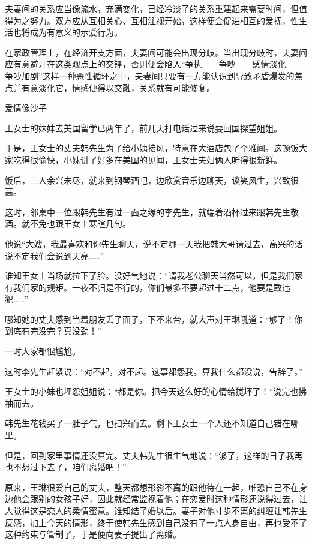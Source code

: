 \documentclass[12pt,UTF8]{ctexbook}
\begin{document}
夫妻间的关系应当像流水，充满变化，已经冷淡了的关系重建起来需要时间，但值得为之努力。双方应从互相关心、互相注视开始，这样便会促进相互的爱抚，性生活也将成为有意义的示爱行为。

在家政管理上，在经济开支方面，夫妻间可能会出现分歧。当出现分歧时，夫妻间应有意避开在这类观点上的交锋，否则便会陷入“争执——争吵——感情淡化——争吵加剧”这样一种恶性循环之中，夫妻间只要有一方能认识到导致矛盾爆发的焦点并有意淡化它，情感便得以交融，关系就有可能修复。





爱情像沙子


王女士的妹妹去美国留学已两年了，前几天打电话过来说要回国探望姐姐。

于是，王女士的丈夫韩先生为了给小姨接风，特意在大酒店包了个雅间。这顿饭大家吃得很愉快，小妹讲了好多在美国的见闻，王女士夫妇俩人听得很新鲜。

饭后，三人余兴未尽，就来到钢琴酒吧，边欣赏音乐边聊天，谈笑风生，兴致很高。

这时，邻桌中一位跟韩先生有过一面之缘的李先生，就端着酒杯过来跟韩先生敬酒。就不免也跟王女士寒暄几句。

他说“大嫂，我最喜欢和你先生聊天，说不定哪一天我把韩大哥请过去，高兴的话说不定我们会说到天亮……”

谁知王女士当场就拉下了脸。没好气地说：“请我老公聊天当然可以，但是我们家有我们家的规矩。一夜不归是不行的，你们最多不要超过十二点，他要是敢违犯……”

哪知她的丈夫感到当着朋友丢了面子，下不来台，就大声对王琳吼道：“够了！你到底有完没完？真没劲！”

一时大家都很尴尬。

这时李先生赶紧说：“对不起，对不起。这事都怨我。算我什么都没说，告辞了。”

王女士的小妹也埋怨姐姐说：“都是你。把今天这么好的心情给搅坏了！”说完也拂袖而去。

韩先生花钱买了一肚子气，也扫兴而去。剩下王女士一个人还不知道自己错在哪里。

但是，回到家里事情还没算完。丈夫韩先生很生气地说：“够了，这样的日子我再也不想过下去了，咱们离婚吧！”

原来，王琳很爱自己的丈夫，整天都想形影不离的跟他待在一起，唯恐自己不在身边他会跟别的女孩子好，因此就经常监视着他；在恋爱时这种情形还说得过去，让人觉得这是恋人的柔情蜜意。谁知结了婚以后。妻子对他寸步不离的纠缠让韩先生反感，加上今天的情形，终于使韩先生感到自己没有了一点人身自由，再也受不了这种约束与管制了，于是便向妻子提出了离婚。
\end{document}
